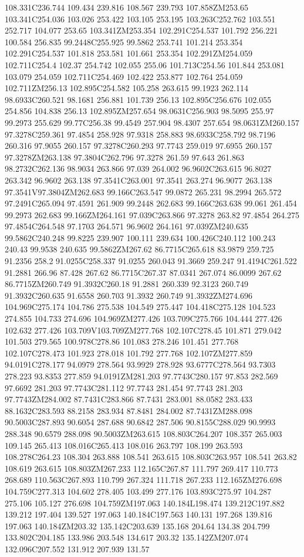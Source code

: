 108.331C236.744 109.434 239.816 108.567 239.793 107.858ZM253.65 103.341C254.036 103.026 253.422 103.105 253.195 103.263C252.762 103.551 252.717 104.077 253.65 103.341ZM253.354 102.291C254.537 101.792 256.221 100.584 256.835 99.2448C255.925 99.5862 253.741 101.214 253.354 102.291C254.537 101.818 253.581 101.661 253.354 102.291ZM254.059 102.711C254.4 102.37 254.742 102.055 255.06 101.713C254.56 101.844 253.081 103.079 254.059 102.711C254.469 102.422 253.877 102.764 254.059 102.711ZM256.13 102.895C254.582 105.258 263.615 99.1923 262.114 98.6933C260.521 98.1681 256.881 101.739 256.13 102.895C256.676 102.055 254.856 104.838 256.13 102.895ZM257.654 98.0631C256.903 98.5095 255.97 99.2973 255.629 99.77C256.38 99.4549 257.904 98.4307 257.654 98.0631ZM260.157 97.3278C259.361 97.4854 258.928 97.9318 258.883 98.6933C258.792 98.7196 260.316 97.9055 260.157 97.3278C260.293 97.7743 259.019 97.6955 260.157 97.3278ZM263.138 97.3804C262.796 97.3278 261.59 97.643 261.863 98.2732C262.136 98.9034 263.866 97.039 264.002 96.9602C263.615 96.8027 263.342 96.9602 263.138 97.3541C263.001 97.3541 263.274 96.9077 263.138 97.3541V97.3804ZM262.683 99.166C263.547 99.0872 265.231 98.2994 265.572 97.2491C265.094 97.4591 261.909 99.2448 262.683 99.166C263.638 99.061 261.454 99.2973 262.683 99.166ZM264.161 97.039C263.866 97.3278 263.82 97.4854 264.275 97.4854C264.548 97.1703 264.571 96.9602 264.161 97.039ZM240.635 99.5862C240.248 99.8225 239.907 100.111 239.634 100.426C240.112 100.243 240.43 99.9538 240.635 99.5862ZM267.62 86.7715C265.618 83.9879 259.725 91.2356 258.2 91.0255C258.337 91.0255 260.043 91.3669 259.247 91.4194C261.522 91.2881 266.96 87.428 267.62 86.7715C267.37 87.0341 267.074 86.0099 267.62 86.7715ZM260.749 91.3932C260.18 91.2881 260.339 92.3123 260.749 91.3932C260.635 91.6558 260.703 91.3932 260.749 91.3932ZM274.696 104.969C275.174 104.786 275.538 104.549 275.447 104.418C275.128 104.523 274.855 104.733 274.696 104.969ZM277.426 103.709C275.766 104.444 277.426 102.632 277.426 103.709V103.709ZM277.768 102.107C278.45 101.871 279.042 101.503 279.565 100.978C278.86 101.083 278.246 101.451 277.768 102.107C278.473 101.923 278.018 101.792 277.768 102.107ZM277.859 94.0191C278.177 94.0979 278.564 93.9929 278.928 93.6777C278.564 93.7303 278.223 93.8353 277.859 94.0191ZM281.203 97.7743C280.157 97.853 282.569 97.6692 281.203 97.7743C281.112 97.7743 281.454 97.7743 281.203 97.7743ZM284.002 87.7431C283.866 87.7431 283.001 88.0582 283.433 88.1632C283.593 88.2158 283.934 87.8481 284.002 87.7431ZM288.098 90.5003C287.893 90.6054 287.688 90.6842 287.506 90.8155C288.029 90.9993 288.348 90.6579 288.098 90.5003ZM263.615 108.803C264.207 108.357 265.003 109.145 265.413 108.016C265.413 108.016 263.797 108.199 263.593 108.278C264.23 108.304 263.888 108.541 263.615 108.803C263.957 108.541 263.82 108.619 263.615 108.803ZM267.233 112.165C267.87 111.797 269.417 110.773 268.689 110.563C267.893 110.799 267.324 111.718 267.233 112.165ZM276.698 104.759C277.313 104.602 278.405 103.499 277.176 103.893C275.97 104.287 275.106 105.127 276.698 104.759ZM197.063 140.184L198.474 139.212C197.882 139.212 197.404 139.527 197.063 140.184C197.563 140.131 197.268 139.816 197.063 140.184ZM203.32 135.142C203.639 135.168 204.64 134.38 204.799 133.802C204.185 133.986 203.548 134.617 203.32 135.142ZM207.074 132.096C207.552 131.912 207.939 131.57 